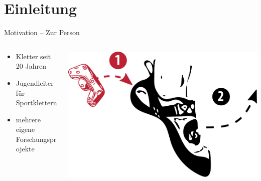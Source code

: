 \section{Einleitung}

\begin{frame}{Motivation -- Zur Person}
  \begin{columns}
	\begin{column}{0.4\textwidth}
		\begin{itemize}[label=\textcolor{tertiary}{}]
			\item Kletter seit 20 Jahren
			\item Jugendleiter für Sportklettern
			\item mehrere eigene Forschungsprojekte
		\end{itemize}
	\end{column}
	\begin{column}{0.5\textwidth}
		\begin{center}
			\includegraphics[width=0.8\columnwidth]{include/images/climbing-shoe-with-instructions-on.pdf}
		\end{center}
	\end{column}
\end{columns}
\end{frame}

